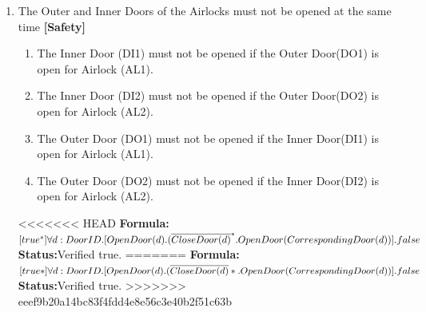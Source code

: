 \documentclass[a4paper,12pt]{article}
\begin{document}
\begin{enumerate}
		
		
		\item The Outer and Inner Doors of the Airlocks must not be opened at the same time \textbf{[Safety]}
		\begin{enumerate}
			\item The Inner Door (DI1) must not be opened if the Outer Door(DO1) is open for Airlock (AL1).
			
			\item The Inner Door (DI2) must not be opened if the Outer Door(DO2) is open for Airlock (AL2).
			
			\item The Outer Door (DO1) must not be opened if the Inner Door(DI1) is open for Airlock (AL1).
			
			\item The Outer Door (DO2) must not be opened if the Inner Door(DI2) is open for Airlock (AL2).
		\end{enumerate}
		
<<<<<<< HEAD
		\textbf{Formula:} $[true^*] \forall d: DoorID.[OpenDoor(d).
		\\(\overline{CloseDoor(d)}^*.OpenDoor(CorrespondingDoor(d))].false$ \\\textbf{Status:}Verified true.
=======
		\textbf{Formula:} $[true*] \forall d: DoorID.[OpenDoor(d).
		\\(\overline{CloseDoor(d)}*.OpenDoor(CorrespondingDoor(d))].false$ \\\textbf{Status:}Verified true.
>>>>>>> eeef9b20a14bc83f4fdd4e8e56c3e40b2f51c63b
		

\end{enumerate}
\end{document}
